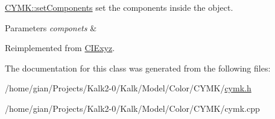 \hyperlink{class_c_y_m_k_a897a2a1030cfd10dc16d5e2de825b45e}{C\+Y\+M\+K\+::set\+Components} set the components inside the object. 


\begin{DoxyParams}{Parameters}
{\em componets} & \\
\hline
\end{DoxyParams}


Reimplemented from \hyperlink{class_c_i_exyz_a11468574f91d2cb1356f0cde56429b84}{C\+I\+Exyz}.



The documentation for this class was generated from the following files\+:\begin{DoxyCompactItemize}
\item 
/home/gian/\+Projects/\+Kalk2-\/0/\+Kalk/\+Model/\+Color/\+C\+Y\+M\+K/\hyperlink{cymk_8h}{cymk.\+h}\item 
/home/gian/\+Projects/\+Kalk2-\/0/\+Kalk/\+Model/\+Color/\+C\+Y\+M\+K/cymk.\+cpp\end{DoxyCompactItemize}

